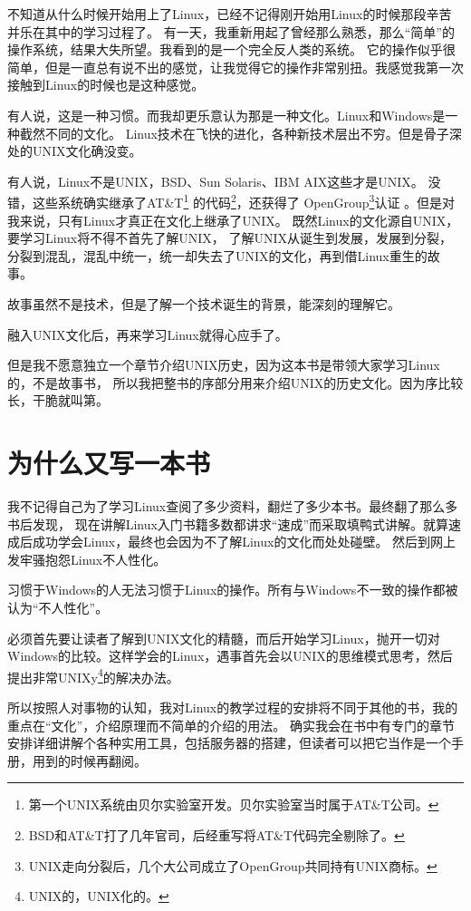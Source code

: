 

不知道从什么时候开始用上了Linux，已经不记得刚开始用Linux的时候那段辛苦并乐在其中的学习过程了。
有一天，我重新用起了曾经那么熟悉，那么“简单”的操作系统，结果大失所望。我看到的是一个完全反人类的系统。
它的操作似乎很简单，但是一直总有说不出的感觉，让我觉得它的操作非常别扭。我感觉我第一次接触到Linux的时候也是这种感觉。

有人说，这是一种习惯。而我却更乐意认为那是一种文化。Linux和Windows是一种截然不同的文化。
Linux技术在飞快的进化，各种新技术层出不穷。但是骨子深处的UNIX文化确没变。

有人说，Linux不是UNIX，BSD、Sun Solaris、IBM AIX这些才是UNIX。
没错，这些系统确实继承了AT\&T\footnote{第一个UNIX系统由贝尔实验室开发。贝尔实验室当时属于AT\&T公司。}
的代码\footnote{BSD和AT\&T打了几年官司，后经重写将AT\&T代码完全剔除了。}，还获得了
OpenGroup\footnote{UNIX走向分裂后，几个大公司成立了OpenGroup共同持有UNIX商标。}认证
。但是对我来说，只有Linux才真正在文化上继承了UNIX。
既然Linux的文化源自UNIX，要学习Linux将不得不首先了解UNIX，
了解UNIX从诞生到发展，发展到分裂，分裂到混乱，混乱中统一，统一却失去了UNIX的文化，再到借Linux重生的故事。

故事虽然不是技术，但是了解一个技术诞生的背景，能深刻的理解它。

融入UNIX文化后，再来学习Linux就得心应手了。

但是我不愿意独立一个章节介绍UNIX历史，因为这本书是带领大家学习Linux的，不是故事书，
所以我把整书的序部分用来介绍UNIX的历史文化。因为序比较长，干脆就叫第。

\section{为什么又写一本书}

我不记得自己为了学习Linux查阅了多少资料，翻烂了多少本书。最终翻了那么多书后发现，
现在讲解Linux入门书籍多数都讲求“速成”而采取填鸭式讲解。就算速成后成功学会Linux，最终也会因为不了解Linux的文化而处处碰壁。
然后到网上发牢骚抱怨Linux不人性化。

\begin{notice}
习惯于Windows的人无法习惯于Linux的操作。所有与Windows不一致的操作都被认为“不人性化”。
\end{notice}

必须首先要让读者了解到UNIX文化的精髓，而后开始学习Linux，抛开一切对Windows的比较。这样学会的Linux，遇事首先会以UNIX的思维模式思考，然后提出非常UNIXy\footnote{UNIX的，UNIX化的。}的解决办法。

所以按照人对事物的认知，我对Linux的教学过程的安排将不同于其他的书，我的重点在“文化”，介绍原理而不简单的介绍的用法。
确实我会在书中有专门的章节安排详细讲解个各种实用工具，包括服务器的搭建，但读者可以把它当作是一个手册，用到的时候再翻阅。

